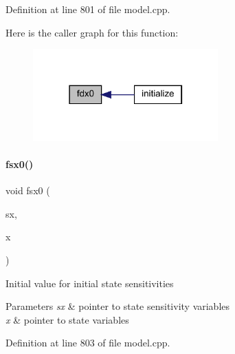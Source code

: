 Definition at line 801 of file model.\+cpp.

Here is the caller graph for this function\+:
\nopagebreak
\begin{figure}[H]
\begin{center}
\leavevmode
\includegraphics[width=202pt]{classamici_1_1_model_a8c3a1647a75581d9e2fc5de106d87a0d_icgraph}
\end{center}
\end{figure}
\mbox{\label{classamici_1_1_model_a6f46a63f0524ad25e4125254b78fdee9}} 
\paragraph{\texorpdfstring{fsx0()}{fsx0()}\hspace{0.1cm}{\footnotesize\ttfamily [1/2]}}
{\footnotesize\ttfamily void fsx0 (\begin{DoxyParamCaption}\item[{\mbox{\hyperlink{classamici_1_1_ami_vector_array}{Ami\+Vector\+Array}} $\ast$}]{sx,  }\item[{const \mbox{\hyperlink{classamici_1_1_ami_vector}{Ami\+Vector}} $\ast$}]{x }\end{DoxyParamCaption})}

Initial value for initial state sensitivities 
\begin{DoxyParams}{Parameters}
{\em sx} & pointer to state sensitivity variables \\
\hline
{\em x} & pointer to state variables \\
\hline
\end{DoxyParams}


Definition at line 803 of file model.\+cpp.

